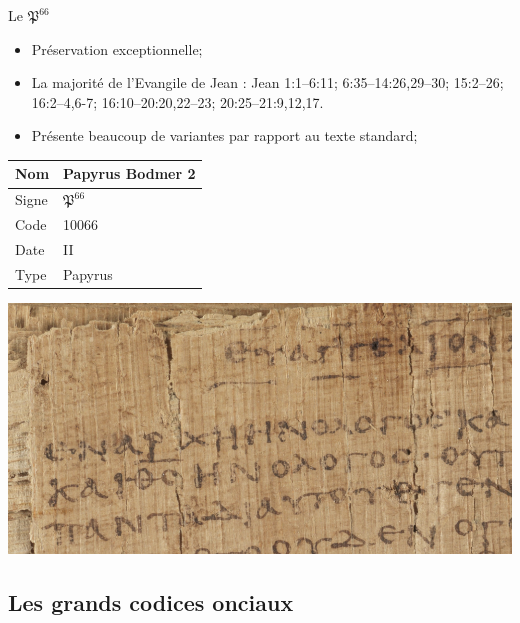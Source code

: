 \documentclass[11pt]{beamer}
\begin{document}
\begin{frame}{Le $\mathfrak{P}^{66}$}
    \begin{block}{}
        \begin{itemize}
            \item Préservation exceptionnelle;
            \item La majorité de l'Evangile de Jean : Jean 1:1–6:11; 6:35–14:26,29–30; 15:2–26; 16:2–4,6-7; 16:10–20:20,22–23; 20:25–21:9,12,17.
            \item Présente beaucoup de variantes par rapport au texte standard;
        \end{itemize}
    \end{block}
    \vfill

    \begin{minipage}{.45\textwidth}
\begin{tabularx}{\textwidth}{l|X}
    \small
     Nom & Papyrus Bodmer 2 \\
     \hline
     Signe & $\mathfrak{P}^{66}$ \\
     \hline
     Code & 10066\\
     \hline
     Date & II\ieme{} \\
     \hline
     Type & Papyrus \\
\end{tabularx}
\end{minipage}
\hfill
\begin{minipage}{.45\textwidth}
    \includegraphics[scale=.4]{img/jn_1_1_p66.png}
\end{minipage}
\end{frame}


\subsection{Les grands codices onciaux}
\end{document}
